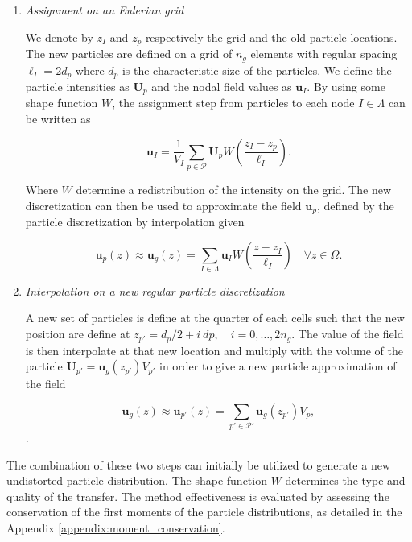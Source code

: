 \begin{enumerate}[label=(\alph*)]
	\item  \textit{Assignment on an Eulerian grid} \label{assigment}

	      We denote by $z_{I}$ and $z_{p}$ respectively the grid and the old particle locations. The new particles are defined on a grid of $n_g$ elements with regular spacing $\ell_I = 2 d_p$ where $d_p$ is the characteristic size of the particles. We define the particle intensities as $\bm U_p$ and the nodal field values as $\bm u_I$. By using some shape function $W$, the assignment step from particles to each node $I \in \Lambda$ can be written as

	      \begin{equation*}
		      \bm{u}_I = \frac1{V_I} \sum_{p \in \mathcal P} \bm U_p  W \left(\frac{z_I - z_p}{\ell_I} \right).
	      \end{equation*}

	      Where $W$ determine a redistribution of the intensity on the grid. The new discretization can then be used to approximate the field $\bm{u}_p$, defined by the particle discretization by interpolation given

	      \begin{equation*}
		      \bm{u}_p(z) \approx \bm{u}_g(z) = \sum_{I \in \Lambda} \bm u_I W \left(\frac{z - z_I}{\ell_I} \right) \quad \forall z \in \Omega.
	      \end{equation*}
	\item  \textit{Interpolation on a new regular particle discretization} \label{interpolation}

	      A new set of particles is define at the quarter of each cells such that the new position are define at $z_{p'} = d_p/2 + i~dp, \quad i = 0,\dots, 2n_g $. The value of the field is then interpolate at that new location and multiply with the volume of the particle $\bm{U}_{p'} = \bm  u_g(z_{p'}) V_{p'}$ in order to give a new particle approximation of the field

	      \begin{equation*}
		      \bm{u}_g(z)  \approx \bm{u}_{p'}(z) = \sum_{p'\in\mathcal P'} \bm{u}_g(z_{p'}) V_p,
	      \end{equation*}.
\end{enumerate}

The combination of these two steps can initially be utilized to generate a new undistorted particle distribution.
The shape function $W$ determines the type and quality of the transfer. The method effectiveness is evaluated by assessing the conservation of the first moments of the particle distributions, as detailed in the Appendix \ref{appendix:moment_conservation}.

